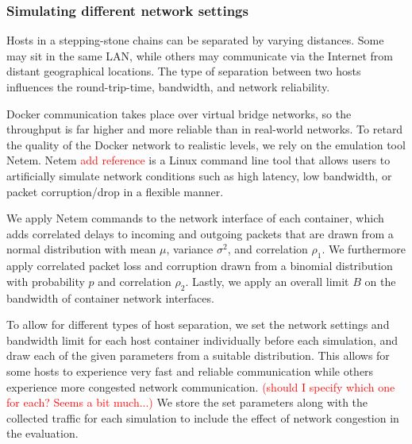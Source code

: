 \documentclass[runningheads]{llncs}\usepackage[]{graphicx}\usepackage[]{color}
\begin{document}
\subsubsection{Simulating different network settings}\label{Sec:congestion}

Hosts in a stepping-stone chains can be separated by varying distances. Some may sit in the same LAN, while others may communicate via the Internet from distant geographical locations. The type of separation between two hosts influences the round-trip-time, bandwidth, and network reliability. 

Docker communication takes place over virtual bridge networks, so the throughput is far higher and more reliable than in real-world networks. %
To retard the quality of the Docker network to realistic levels, we rely on the emulation tool Netem. Netem \textcolor{red}{add reference} is a Linux command line tool that allows users to artificially simulate network conditions such as high latency, low bandwidth, or packet corruption/drop in a flexible manner.

We apply Netem commands to the network interface of each container, which adds correlated delays to incoming and outgoing packets that are drawn from a normal distribution with mean $\mu$, variance $\sigma^2$, and correlation $\rho_1$. We furthermore apply correlated packet loss and corruption drawn from a binomial distribution with probability $p$ and correlation $\rho_2$. Lastly, we apply an overall limit $B$ on the bandwidth of container network interfaces.

To allow for different types of host separation, we set the network settings and bandwidth limit for each host container individually before each simulation, and draw each of the given parameters from a suitable distribution. This allows for some hosts to experience very fast and reliable communication while others experience more congested network communication.  \textcolor{red}{(should I specify which one for each? Seems a bit much...)} %
We store the set parameters along with the collected traffic for each simulation to include the effect of network congestion in the evaluation. 

\end{document}
